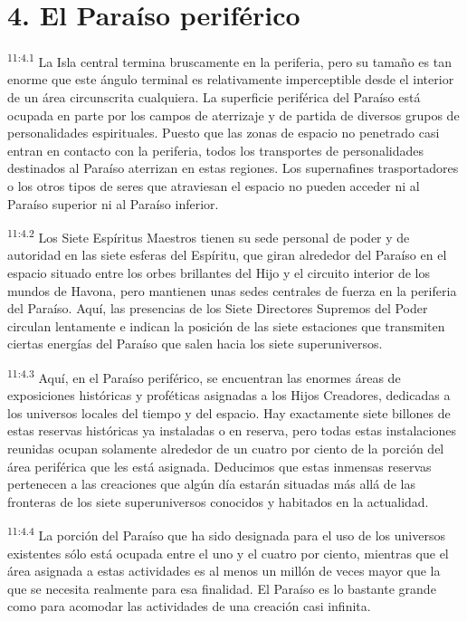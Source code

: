 \section*{4. El Paraíso periférico}
\par
\textsuperscript{11:4.1} La Isla central termina bruscamente en la periferia, pero su tamaño es tan enorme que este ángulo terminal es relativamente imperceptible desde el interior de un área circunscrita cualquiera. La superficie periférica del Paraíso está ocupada en parte por los campos de aterrizaje y de partida de diversos grupos de personalidades espirituales. Puesto que las zonas de espacio no penetrado casi entran en contacto con la periferia, todos los transportes de personalidades destinados al Paraíso aterrizan en estas regiones. Los supernafines trasportadores o los otros tipos de seres que atraviesan el espacio no pueden acceder ni al Paraíso superior ni al Paraíso inferior.

\par
\textsuperscript{11:4.2} Los Siete Espíritus Maestros tienen su sede personal de poder y de autoridad en las siete esferas del Espíritu, que giran alrededor del Paraíso en el espacio situado entre los orbes brillantes del Hijo y el circuito interior de los mundos de Havona, pero mantienen unas sedes centrales de fuerza en la periferia del Paraíso. Aquí, las presencias de los Siete Directores Supremos del Poder circulan lentamente e indican la posición de las siete estaciones que transmiten ciertas energías del Paraíso que salen hacia los siete superuniversos.

\par
\textsuperscript{11:4.3} Aquí, en el Paraíso periférico, se encuentran las enormes áreas de exposiciones históricas y proféticas asignadas a los Hijos Creadores, dedicadas a los universos locales del tiempo y del espacio. Hay exactamente siete billones de estas reservas históricas ya instaladas o en reserva, pero todas estas instalaciones reunidas ocupan solamente alrededor de un cuatro por ciento de la porción del área periférica que les está asignada. Deducimos que estas inmensas reservas pertenecen a las creaciones que algún día estarán situadas más allá de las fronteras de los siete superuniversos conocidos y habitados en la actualidad.

\par
\textsuperscript{11:4.4} La porción del Paraíso que ha sido designada para el uso de los universos existentes sólo está ocupada entre el uno y el cuatro por ciento, mientras que el área asignada a estas actividades es al menos un millón de veces mayor que la que se necesita realmente para esa finalidad. El Paraíso es lo bastante grande como para acomodar las actividades de una creación casi infinita.

